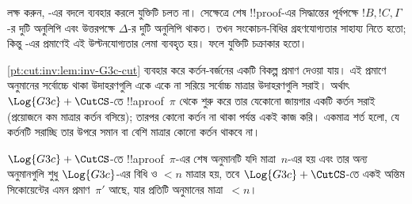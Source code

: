 \documentclass[../../../include/open-logic-section]{subfiles}
\begin{document}
লক্ষ করুন, \CutCS-এর বদলে \Cut{} ব্যবহার করলে যুক্তিটি চলত না।
সেক্ষেত্রে শেষ !!{proof}-এর সিদ্ধান্তের পূর্বপক্ষে
$!B, !C, \Gamma$-র দুটি অনুলিপি এবং উত্তরপক্ষে $\Delta$-র দুটি
অনুলিপি থাকত। তখন সংকোচন-বিধির গ্রহণযোগ্যতার সাহায্য নিতে হতো;
কিন্তু -এর প্রমাণেই এই
উল্টনযোগ্যতার লেমা ব্যবহৃত হয়। ফলে যুক্তিটি চক্রাকার হতো।

\cref{pt:cut:inv:lem:inv-G3c-cut} ব্যবহার করে কর্তন-বর্জনের একটি
বিকল্প প্রমাণ দেওয়া যায়। এই প্রমাণে \CutCS{} অনুমানের সর্বোচ্চে
থাকা উদাহরণগুলি একে একে না সরিয়ে সর্বোচ্চ মাত্রার উদাহরণগুলি সরাই।
অর্থাৎ $\Log{G3c} + \CutCS$-তে !!a{proof}~$\pi$ থেকে শুরু করে তার
যেকোনো জায়গার একটি কর্তন সরাই (প্রয়োজনে কম মাত্রার কর্তন বসিয়ে);
তারপর কোনো কর্তন না থাকা পর্যন্ত একই কাজ করি। একমাত্র শর্ত হলো,
যে কর্তনটি সরাচ্ছি তার উপরে সমান বা বেশি মাত্রার কোনো কর্তন থাকবে না।

\begin{lem} $\Log{G3c}+\CutCS$-তে
!!a{proof}~$\pi$-এর শেষ অনুমানটি যদি মাত্রা~$n$-এর \CutCS{} হয়
এবং তার অন্য অনুমানগুলি শুধু $\Log{G3c}$-এর বিধি ও $<n$ মাত্রার
\CutCS{} হয়, তবে $\Log{G3c}+\CutCS$-তে একই অন্তিম সিকোয়েন্টের
এমন প্রমাণ~$\pi'$ আছে, যার প্রতিটি \CutCS{} অনুমানের মাত্রা~$<n$।
\end{lem}
\end{document}
